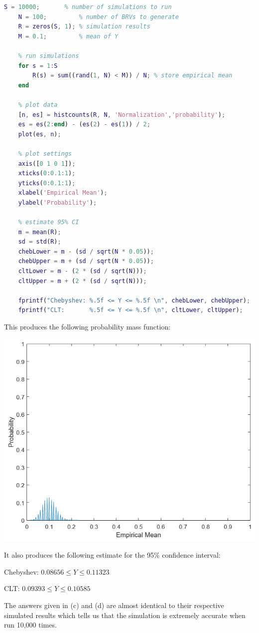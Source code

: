 \documentclass[12pt]{article}
\begin{document}
\begin{lstlisting}[language=Matlab]
    S = 10000;       % number of simulations to run
    N = 100;         % number of BRVs to generate
    R = zeros(S, 1); % simulation results
    M = 0.1;         % mean of Y
    
    % run simulations
    for s = 1:S
        R(s) = sum((rand(1, N) < M)) / N; % store empirical mean
    end
    
    % plot data
    [n, es] = histcounts(R, N, 'Normalization','probability');
    es = es(2:end) - (es(2) - es(1)) / 2;
    plot(es, n);
    
    % plot settings
    axis([0 1 0 1]);
    xticks(0:0.1:1);
    yticks(0:0.1:1);
    xlabel('Empirical Mean');
    ylabel('Probability');
    
    % estimate 95% CI
    m = mean(R);
    sd = std(R);
    chebLower = m - (sd / sqrt(N * 0.05));
    chebUpper = m + (sd / sqrt(N * 0.05));
    cltLower = m - (2 * (sd / sqrt(N)));
    cltUpper = m + (2 * (sd / sqrt(N)));
    
    fprintf("Chebyshev: %.5f <= Y <= %.5f \n", chebLower, chebUpper);
    fprintf("CLT:       %.5f <= Y <= %.5f \n", cltLower, cltUpper);
\end{lstlisting}

\indent This produces the following probability mass function:

\begin{center}
    \includegraphics[scale=0.7]{plot.png}
\end{center}

\indent It also produces the following estimate for the 95\% confidence interval:

\begin{center}
    \indent Chebyshev: $0.08656 \le Y \le 0.11323$ 

    \indent CLT: $0.09393 \le Y \le 0.10585$
\end{center}

\indent The answers given in (c) and (d) are almost identical to their respective simulated results which tells us that the simulation is extremely accurate when run 10,000 times.
\end{document}
